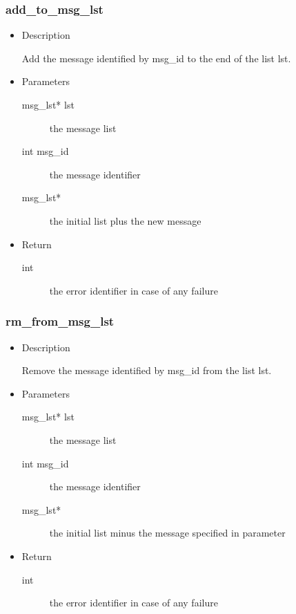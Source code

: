 \subsubsection{add\_to\_msg\_lst}
\begin{itemize}
  \item{Description}

	 Add the message identified by msg\_id to the end of the list lst.
  \item{Parameters}
	 \begin{description}
		\item[msg\_lst* lst] the message list
		\item[int msg\_id] the message identifier
		\item[msg\_lst*] the initial list plus the new message
	 \end{description}
  \item{Return}
	 \begin{description}
		\item[int] the error identifier in case of any failure
	 \end{description}
\end{itemize}

\subsubsection{rm\_from\_msg\_lst}
\begin{itemize}
  \item{Description}

	 Remove the message identified by msg\_id from the list lst.
  \item{Parameters}
	 \begin{description}
		\item[msg\_lst* lst] the message list
		\item[int msg\_id] the message identifier
		\item[msg\_lst*] the initial list minus the message specified in parameter
	 \end{description}
  \item{Return}
	 \begin{description}
		\item[int] the error identifier in case of any failure
	 \end{description}
\end{itemize}

